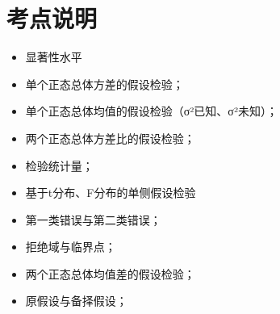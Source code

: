 \section{考点说明}
\begin{itemize}
\item 显著性水平
\item 单个正态总体方差的假设检验；
\item 单个正态总体均值的假设检验（σ²已知、σ²未知）；
\item 两个正态总体方差比的假设检验；
\item 检验统计量；
\item 基于t分布、F分布的单侧假设检验
\item 第一类错误与第二类错误；
\item 拒绝域与临界点；
\item 两个正态总体均值差的假设检验；
\item 原假设与备择假设；
\end{itemize}

